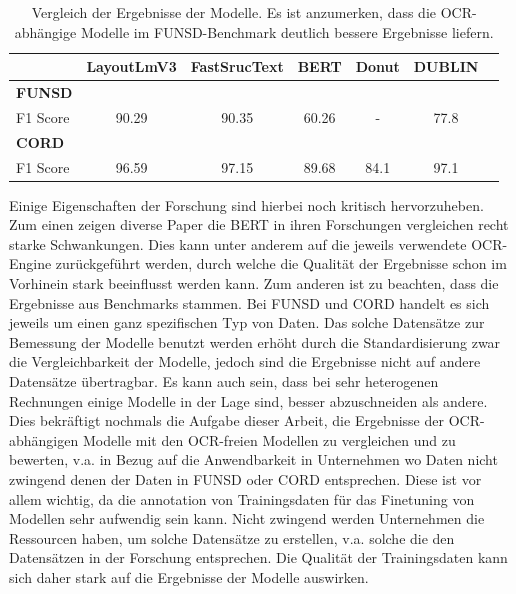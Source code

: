 \begin{table}[htbp]
    \centering
    \begin{tabular}{lcccccc}
      \toprule
      & \textbf{LayoutLmV3} & \textbf{FastSrucText} & \textbf{BERT} & \textbf{Donut} & \textbf{DUBLIN} \\
      \midrule
      \textbf{FUNSD} \\
      F1 Score & 90.29 & 90.35 & 60.26 & - & 77.8 \\
      \addlinespace
      \textbf{CORD} \\
      F1 Score & 96.59 & 97.15 & 89.68 & 84.1 & 97.1 \\
      \bottomrule
    \end{tabular}
    \caption{Vergleich der Ergebnisse der Modelle. Es ist anzumerken, dass die OCR-abhängige Modelle im FUNSD-Benchmark deutlich bessere Ergebnisse liefern.}
  \end{table}

  Einige Eigenschaften der Forschung sind hierbei noch kritisch hervorzuheben. Zum einen zeigen diverse Paper die \ac{BERT} in ihren Forschungen vergleichen recht starke Schwankungen. Dies kann unter anderem auf die jeweils verwendete OCR-Engine zurückgeführt werden, durch welche die Qualität der Ergebnisse schon im Vorhinein stark beeinflusst werden kann. Zum anderen ist zu beachten, dass die Ergebnisse aus Benchmarks stammen. Bei \ac{FUNSD} und \ac{CORD} handelt es sich jeweils um einen ganz spezifischen Typ von Daten. Das solche Datensätze zur Bemessung der Modelle benutzt werden erhöht durch die Standardisierung zwar die Vergleichbarkeit der Modelle, jedoch sind die Ergebnisse nicht auf andere Datensätze übertragbar. Es kann auch sein, dass bei sehr heterogenen Rechnungen einige Modelle in der Lage sind, besser abzuschneiden als andere. Dies bekräftigt nochmals die Aufgabe dieser Arbeit, die Ergebnisse der OCR-abhängigen Modelle mit den OCR-freien Modellen zu vergleichen und zu bewerten, v.a. in Bezug auf die Anwendbarkeit in Unternehmen wo Daten nicht zwingend denen der Daten in \ac{FUNSD} oder \ac{CORD} entsprechen. Diese ist vor allem wichtig, da die annotation von Trainingsdaten für das Finetuning von Modellen sehr aufwendig sein kann. Nicht zwingend werden Unternehmen die Ressourcen haben, um solche Datensätze zu erstellen, v.a. solche die den Datensätzen in der Forschung entsprechen. Die Qualität der Trainingsdaten kann sich daher stark auf die Ergebnisse der Modelle auswirken.